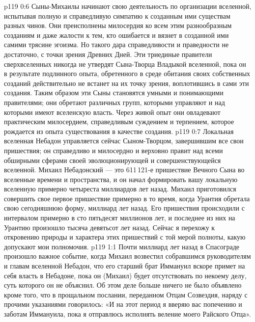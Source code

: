 \vs p119 0:6 Сыны\hyp{}Михаилы начинают свою деятельность по организации вселенной, испытывая полную и справедливую симпатию к созданным ими существам разных чинов. Они преисполнены милосердия ко всем этим разнообразным созданиям и даже жалости к тем, кто ошибается и вязнет в созданной ими самими трясине эгоизма. Но такого дара справедливости и праведности не достаточно, с точки зрения Древних Дней. Эти триединые правители сверхвселенных никогда не утвердят Сына\hyp{}Творца Владыкой вселенной, пока он в результате подлинного опыта, обретенного в среде обитания своих собственных созданий действительно не встанет на их точку зрения, воплотившись в сами эти создания. Таким образом эти Сыны становятся умными и понимающими правителями; они обретают  различных групп, которыми управляют и над которыми имеют вселенскую власть. Через живой опыт они овладевают практическим милосердием, справедливым суждением и терпением, которое рождается из опыта существования в качестве создания.
\vs p119 0:7 \pc Локальная вселенная Небадон управляется сейчас Сыном\hyp{}Творцом, завершившим все свои пришествия; он справедливо и милосердно и верховно правит над всеми обширными сферами своей эволюционирующей и совершенствующейся вселенной. Михаил Небадонский --- это 611\,121\hyp{}е пришествие Вечного Сына во вселенные времени и пространства, и он начал формировать вашу локальную вселенную примерно четыреста миллиардов лет назад. Михаил приготовился совершить свое первое пришествие примерно в то время, когда Урантия обретала свою сегодняшнюю форму, миллиард лет назад. Его пришествия происходили с интервалом примерно в сто пятьдесят миллионов лет, и последнее из них на Урантию произошло тысяча девятьсот лет назад. Сейчас я перехожу к откровению природы и характера этих пришествий с той мерой полноты, какую допускают мои полномочия.
\vs p119 1:1 Почти миллиард лет назад в Спасограде произошло важное событие, когда Михаил возвестил собравшимся руководителям и главам вселенной Небадон, что его старший брат Иммануил вскоре примет на себя власть в Небадоне, пока он (Михаил) будет отсутствовать по некоему делу, суть которого он не объяснил. Об этом деле больше ничего не было объявлено кроме того, что в прощальном послании, переданном Отцам Созвездия, наряду с прочими указаниями говорилось: «И на этот период я вверяю вас попечению и заботам Иммануила, пока я отправлюсь исполнять веление моего Райского Отца».
